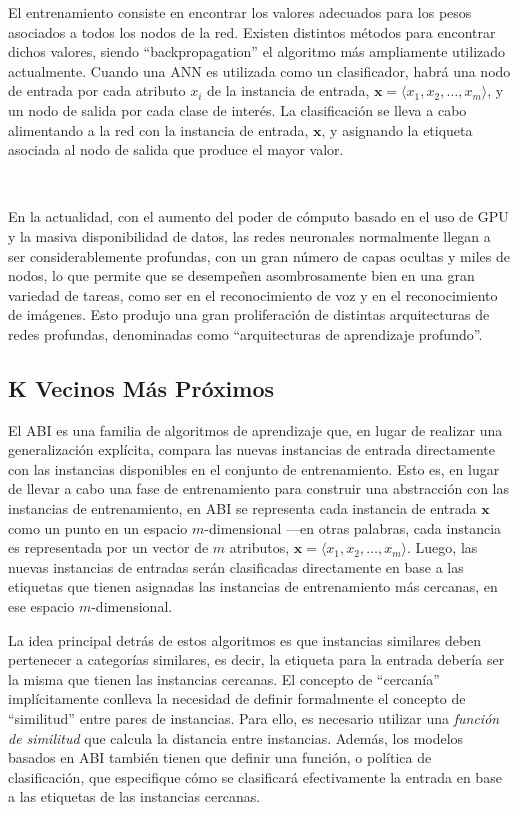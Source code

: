 El entrenamiento consiste en encontrar los valores adecuados para los pesos asociados a todos los nodos de la red. Existen distintos métodos para encontrar dichos valores, siendo ``backpropagation''\cite{chauvin1995backpropagation} el algoritmo más ampliamente utilizado actualmente. 
Cuando una \ac{ANN} es utilizada como un clasificador, habrá una nodo de entrada por cada atributo $x_i$ de la instancia de entrada, $\pmb{x}=\langle x_1,x_2,\dots,x_m\rangle$, y un nodo de salida por cada clase de interés. La clasificación se lleva a cabo alimentando a la red con la instancia de entrada, $\pmb{x}$, y asignando la etiqueta asociada al nodo de salida que produce el mayor valor.

\

En la actualidad, con el aumento del poder de cómputo basado en el uso de GPU y la masiva disponibilidad de datos, las redes neuronales normalmente llegan a ser considerablemente profundas, con un gran número de capas ocultas y miles de nodos, lo que permite que se desempeñen asombrosamente bien en una gran variedad de tareas, como ser en el reconocimiento de voz y en el reconocimiento de imágenes. Esto produjo una gran proliferación de distintas arquitecturas de redes profundas, denominadas como ``arquitecturas de aprendizaje profundo''\cite{goodfellow2016deep}. %

\subsection{K Vecinos Más Próximos}

El \ac{ABI} es una familia de algoritmos de aprendizaje que, en lugar de realizar una generalización explícita, compara las nuevas instancias de entrada directamente con las instancias disponibles en el conjunto de entrenamiento.
Esto es, en lugar de llevar a cabo una fase de entrenamiento para construir una abstracción con las instancias de entrenamiento, en \ac{ABI} se representa cada instancia de entrada $\pmb{x}$ como un punto en un espacio $m$-dimensional ---en otras palabras, cada instancia es representada por un vector de $m$ atributos, $\pmb{x}=\langle x_1,x_2,\dots,x_m\rangle$. Luego, las nuevas instancias de entradas serán clasificadas directamente en base a las etiquetas que tienen asignadas las instancias de entrenamiento más cercanas, en ese espacio $m$-dimensional.

La idea principal detrás de estos algoritmos es que instancias similares deben pertenecer a categorías similares, es decir, la etiqueta para la entrada debería ser la misma que tienen las instancias cercanas. El concepto de ``cercanía'' implícitamente conlleva la necesidad de definir formalmente el concepto de ``similitud'' entre pares de instancias. Para ello, es necesario utilizar una \emph{función de similitud} que calcula la distancia entre instancias. Además, los modelos basados en \ac{ABI} también tienen que definir una función, o política de clasificación, que especifique cómo se clasificará efectivamente la entrada en base a las etiquetas de las instancias cercanas.

